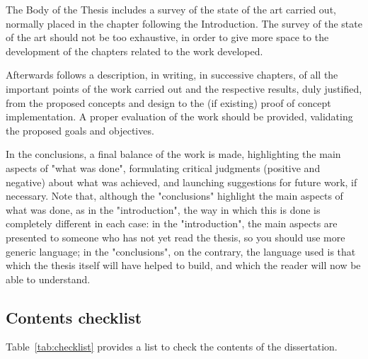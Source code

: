 The Body of the Thesis includes a survey of the state of the art carried out, normally placed in the chapter following the Introduction. The survey of the state of the art should not be too exhaustive, in order to give more space to the development of the chapters related to the work developed.

Afterwards follows a description, in writing, in successive chapters, of all the important points of the work carried out and the respective results, duly justified, from the proposed concepts and design to the (if existing) proof of concept implementation. A proper evaluation of the work should be provided, validating the proposed goals and objectives.

In the conclusions, a final balance of the work is made, highlighting the main aspects of "what was done", formulating critical judgments (positive and negative) about what was achieved, and launching suggestions for future work, if necessary. Note that, although the "conclusions" highlight the main aspects of what was done, as in the "introduction", the way in which this is done is completely different in each case: in the "introduction", the main aspects are presented to someone who has not yet read the thesis, so you should use more generic language; in the "conclusions", on the contrary, the language used is that which the thesis itself will have helped to build, and which the reader will now be able to understand.

\subsection{Contents checklist}

Table~\ref{tab:checklist} provides a list to check the contents of the dissertation. 

